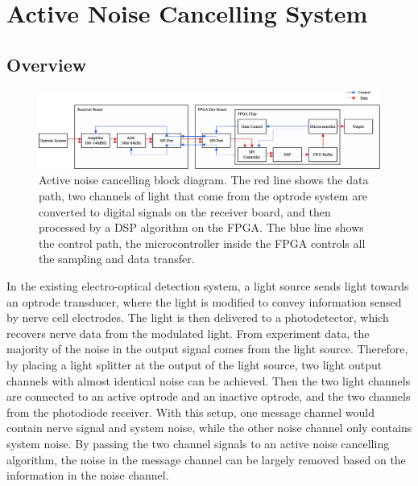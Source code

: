 \chapter[Active noise cancelling design]{Active Noise Cancelling System} \label{c:tc1} 

\section{Overview}

\begin{figure}[h]
\centering
\includegraphics[width=0.9\linewidth]{4-ANC_Sys/ANCBlockDiagram.pdf}
\caption{Active noise cancelling block diagram.  The red line shows the data path, two channels of light that come from the optrode system are converted to digital signals on the receiver board, and then processed by a DSP algorithm on the FPGA.  The blue line shows the control path, the microcontroller inside the FPGA controls all the sampling and data transfer.}
\label{fig_ANCBlockDiagram}
\end{figure}

In the existing electro-optical detection system, a light source sends light towards an optrode transducer, where the light is modified to convey information sensed by nerve cell electrodes. The light is then delivered to a photodetector, which recovers nerve data from the modulated light.  From experiment data, the majority of the noise in the output signal comes from the light source.  Therefore, by placing a light splitter at the output of the light source, two light output channels with almost identical noise can be achieved.  Then the two light channels are connected to an active optrode and an inactive optrode, and the two channels from the photodiode receiver.  With this setup, one message channel would contain nerve signal and system noise, while the other noise channel only contains system noise.  By passing the two channel signals to an active noise cancelling algorithm, the noise in the message channel can be largely removed based on the information in the noise channel.

